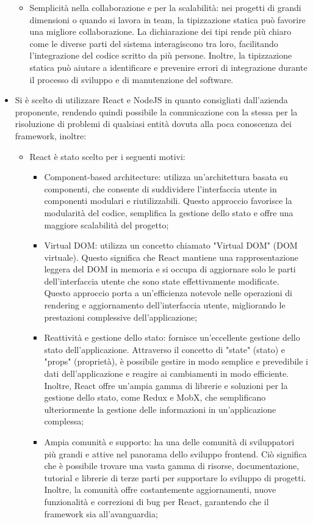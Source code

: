 \documentclass[a4paper, 12pt]{article}
\begin{document}
\begin{itemize}
\begin{itemize}
        \item Semplicità nella collaborazione e per la scalabilità: nei progetti di grandi dimensioni o quando si lavora in team, la tipizzazione statica può favorire una migliore collaborazione. La dichiarazione dei tipi rende più chiaro come le diverse parti del sistema interagiscono tra loro, facilitando l'integrazione del codice scritto da più persone. Inoltre, la tipizzazione statica può aiutare a identificare e prevenire errori di integrazione durante il processo di sviluppo e di manutenzione del software.
    \end{itemize}
    \item Si è scelto di utilizzare React e NodeJS in quanto consigliati dall'azienda proponente, rendendo quindi possibile la comunicazione con la stessa per la risoluzione di problemi di qualsiasi entità dovuta alla poca conoscenza dei framework, inoltre:
    \begin{itemize}
        \item React è stato scelto per i seguenti motivi:
        \begin{itemize}
            \item Component-based architecture: utilizza un'architettura basata su componenti, che consente di suddividere l'interfaccia utente in componenti modulari e riutilizzabili. Questo approccio favorisce la modularità del codice, semplifica la gestione dello stato e offre una maggiore scalabilità del progetto;
            \item Virtual DOM: utilizza un concetto chiamato "Virtual DOM" (DOM virtuale). Questo significa che React mantiene una rappresentazione leggera del DOM in memoria e si occupa di aggiornare solo le parti dell'interfaccia utente che sono state effettivamente modificate. Questo approccio porta a un'efficienza notevole nelle operazioni di rendering e aggiornamento dell'interfaccia utente, migliorando le prestazioni complessive dell'applicazione;
            \item Reattività e gestione dello stato: fornisce un'eccellente gestione dello stato dell'applicazione. Attraverso il concetto di "state" (stato) e "props" (proprietà), è possibile gestire in modo semplice e prevedibile i dati dell'applicazione e reagire ai cambiamenti in modo efficiente. Inoltre, React offre un'ampia gamma di librerie e soluzioni per la gestione dello stato, come Redux e MobX, che semplificano ulteriormente la gestione delle informazioni in un'applicazione complessa;
            \item Ampia comunità e supporto: ha una delle comunità di sviluppatori più grandi e attive nel panorama dello sviluppo frontend. Ciò significa che è possibile trovare una vasta gamma di risorse, documentazione, tutorial e librerie di terze parti per supportare lo sviluppo di progetti. Inoltre, la comunità offre costantemente aggiornamenti, nuove funzionalità e correzioni di bug per React, garantendo che il framework sia all'avanguardia;

\end{itemize}
\end{itemize}
\end{itemize}
\end{document}
